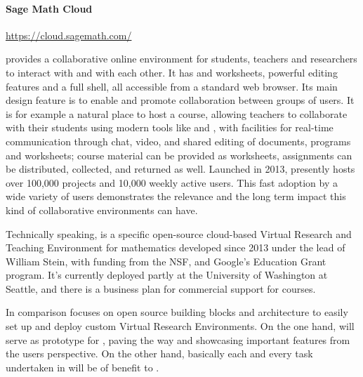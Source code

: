 \paragraph{Sage Math Cloud} \url{https://cloud.sagemath.com/} \label{sec:SMC-page}

\SMC provides a collaborative online environment for students,
teachers and researchers to interact with \Sage and with each
other. It has \Sage and \IPython worksheets, powerful \LATEX editing
features and a full \Linux shell, all accessible from a standard
web browser. Its main design feature is to enable and promote
collaboration between groups of users. It is for example a natural
place to host a course, allowing teachers to collaborate with their
students using modern tools like \Sage and \LATEX, with facilities for
real-time communication through chat, video, and shared editing of
documents, programs and worksheets; course material can be provided as
worksheets, assignments can be distributed, collected, and returned as
well. Launched in 2013, \SMC presently hosts over 100,000 projects and
10,000 weekly active users. This fast adoption by a wide variety of
users demonstrates the relevance and the long term impact this kind of
collaborative environments can have.

Technically speaking, \SMC is a specific open-source cloud-based
Virtual Research and Teaching Environment for mathematics developed
since 2013 under the lead of William Stein, with funding from the NSF,
and Google's Education Grant program.
It's currently deployed partly at the University of Washington at
Seattle, and there is a business plan for commercial support for
courses.



In comparison \TheProject focuses on open source building blocks and
architecture to easily set up and deploy custom Virtual Research
Environments. On the one hand, \SMC will serve as prototype for
\TheProject, paving the way and showcasing important features from the
users perspective. On the other hand, basically each and every task
undertaken in \TheProject will be of benefit to \SMC.


